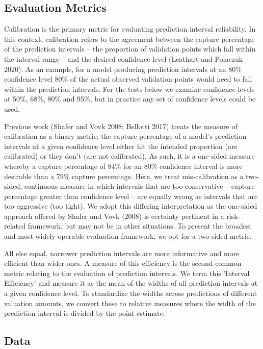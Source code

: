 \documentclass[colTwo]{anon}
\theoremstyle{definition}
\begin{document}
\subsection{Evaluation Metrics}

Calibration is the primary metric for evaluating prediction interval reliability.  In this context, calibration refers to the agreement between the capture percentage of the prediction intervals -- the proportion of validation points which fall within the interval range -- and the desired confidence level (Leathart and Polaczuk 2020).  As an example, for a model producing prediction intervals at an 80\% confidence level 80\% of the actual observed validation points would need to fall within the prediction intervals.  For the tests below we examine confidence levels at 50\%, 68\%, 80\% and 95\%, but in practice any set of confidence levels could be used.

Previous work (Shafer and Vovk 2008; Bellotti 2017) treats the measure of calibration as a binary metric; the capture percentage of a model’s prediction intervals at a given confidence level either hit the intended proportion (are calibrated) or they don’t (are not calibrated).  As such, it is a one-sided measure whereby a capture percentage of 84\% for an 80\% confidence interval is more desirable than a 79\% capture percentage.  Here, we treat mis-calibration as a two-sided, continuous measure in which intervals that are too conservative -- capture percentage greater than confidence level -- are equally wrong as intervals that are too aggressive (too tight). We adopt this differing interpretation as the one-sided approach offered by Shafer and Vovk (2008) is certainty pertinent in a risk-related framework, but may not be in other situations. To present the broadest and most widely operable evaluation framework, we opt for a two-sided metric. 

All else equal, narrower prediction intervals are more informative and more efficient than wider ones.  A measure of this efficiency is the second common metric relating to the evaluation of prediction intervals. We term this 'Interval Efficiency' and measure it as the mean of the widths of all prediction intervals at a given confidence level. To standardize the widths across predictions of different valuation amounts, we convert these to relative measures where the width of the prediction interval is divided by the point estimate.

\subsection{Data}
\end{document}
